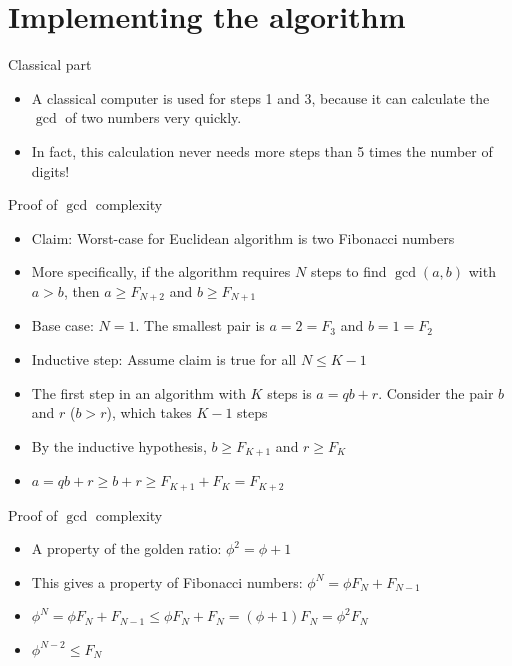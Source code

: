 \documentclass[handout, aspectratio=169]{beamer}
\begin{document}
\section{Implementing the algorithm}
\frame{\sectionpage}

\begin{frame}{Classical part}
    \begin{itemize}
        \item A classical computer is used for steps 1 and 3, because it can calculate the $\gcd$ of two numbers very quickly. \pause
        \item In fact, this calculation never needs more steps than 5 times the number of digits!
    \end{itemize}
\end{frame}

\begin{frame}{Proof of $\gcd$ complexity}
    \begin{itemize}
        \item Claim: Worst-case for Euclidean algorithm is two Fibonacci numbers \pause
        \item More specifically, if the algorithm requires $N$ steps to find $\gcd(a,b)$ with $a>b$, then $a\geq F_{N+2}$ and $b\geq F_{N+1}$ \pause
        \item Base case: $N=1$. The smallest pair is $a=2=F_3$ and $b=1=F_2$ \pause
        \item Inductive step: Assume claim is true for all $N\leq K-1$ \pause
        \item The first step in an algorithm with $K$ steps is $a=qb+r$. Consider the pair $b$ and $r$ ($b>r$), which takes $K-1$ steps \pause
        \item By the inductive hypothesis, $b\geq F_{K+1}$ and $r\geq F_{K}$ \pause
        \item $a=qb+r\geq b+r\geq F_{K+1}+F_K=F_{K+2}$
    \end{itemize}
\end{frame}

\begin{frame}{Proof of $\gcd$ complexity}
    \begin{itemize}
        \item A property of the golden ratio: $\phi^2=\phi+1$ \pause
        \item This gives a property of Fibonacci numbers: $\phi^N=\phi F_N+F_{N-1}$ \pause
        \item $\phi^N=\phi F_N+F_{N-1}\leq \phi F_N+F_N=(\phi+1)F_N=\phi^2 F_N$
        \item $\phi^{N-2}\leq F_N$ \pause
    \end{itemize}
\end{frame}
\end{document}
